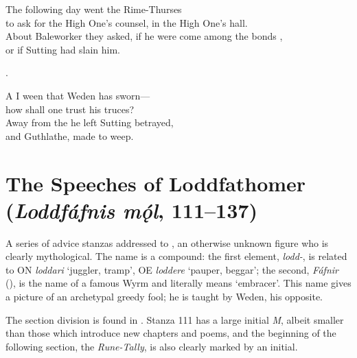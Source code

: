 \bvb The following day went the Rime-Thurses \\
\ind to ask for the High One’s counsel, in the High One’s hall. \\
About Baleworker  they asked, if he were come among the bonds , \\
\ind or if Sutting had slain him.\evb\evg


\bvg\bva {}.\eva

\bvb A  I ween that Weden has sworn— \\
\ind how shall one trust his truces? \\
Away from the  he left Sutting betrayed, \\
\ind and Guthlathe, made to weep.\evb\evg

\sectionline

\section{The Speeches of Loddfathomer (\emph{Loddfáfnis mǫ́l}, 111–137)}

A series of advice stanzas addressed to , an otherwise unknown figure who is clearly mythological.  The name is a compound: the first element, \emph{lodd-}, is related to ON \emph{loddari} ‘juggler, tramp’, OE \emph{loddere} ‘pauper, beggar’; the second, \emph{Fáfnir} (), is the name of a famous Wyrm and literally means ‘embracer’.  This name gives a picture of an archetypal greedy fool; he is taught by Weden, his opposite.

The section division is found in \Regius.  Stanza 111 has a large initial \emph{M}, albeit smaller than those which introduce new chapters and poems, and the beginning of the following section, the \emph{Rune-Tally}, is also clearly marked by an initial.

